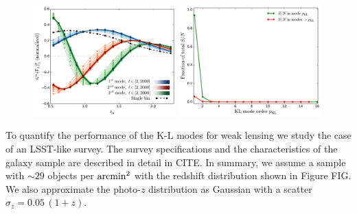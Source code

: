 \documentclass[twocolumn,amsfont,amssymb,amsmath, showpacs,balancelastpage, nofootinbib]{revtex4-1}
\begin{document}
    \begin{figure}
      \centering
      \includegraphics[width=0.49\textwidth]{Figs/kl_modes_wl}
      \includegraphics[width=0.49\textwidth]{Figs/information_wl}
      \caption{}\label{fig:kl_wl}
    \end{figure}
    To quantify the performance of the K-L modes for weak lensing we study the case of an LSST-like survey. The survey specifications and the characteristics of the galaxy sample are described in detail in CITE. In summary, we assume a sample with $\sim29$ objects per ${\rm arcmin}^2$ with the redshift distribution shown in Figure FIG. We also approximate the photo-$z$ distribution as Gaussian with a scatter $\sigma_z=0.05\,(1+z)$.    
    
\end{document}
